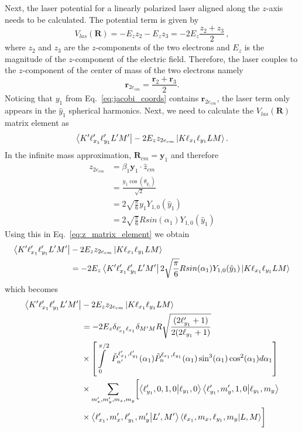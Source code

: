 Next, the laser potential for a linearly polarized laser aligned along the $z$-axis needs to be calculated. The potential term is given by
\begin{equation}
     V_{las}(\mathbf{R}) = - E_z z_2 - E_z z_3 = - 2E_z \frac{z_2 + z_3}{2}\, ,
\end{equation} 
where $z_2$ and $z_3$ are the $z$-components of the two electrons and $E_z$ is the magnitude of the $z$-component of the electric field.
Therefore, the laser couples to the $z$-component of the center of mass of the two electrons namely
\begin{equation}
    \mathbf{r}_{2e_{cm}} = \frac{\mathbf{r}_2 + \mathbf{r}_3}{2}.
\end{equation}
Noticing that $y_1$ from Eq.~\ref{eq:jacobi_coords} contains $\mathbf{r}_{2e_{cm}}$, the laser term only appears in the $\hat{y}_1$ spherical harmonics. 
Next, we need to calculate the $V_{las}(\mathbf{R})$ matrix element as
\begin{equation}
    \bra{K'\ell_{x_1}'\ell_{y_1}'L'M'} -2E_z z_{2e_{cm}} \ket{K \ell_{x_1} \ell_{y_1}LM}.
    \label{eq:z_matrix_element}
\end{equation} 
In the infinite mass approximation, $\mathbf{R}_{cm}=\mathbf{y}_1$  and therefore 
\begin{align}
z_{2e_{cm}}&=\beta_1 \mathbf{y}_1\cdot\hat{z}_{cm} \\
&= \frac{y_1\cos(\theta_{y_1})}{\sqrt{2}}\\
&= 2 \sqrt{\frac{\pi}{6}}y_1Y_{1,0}(\hat{y}_1)\\
&= 2 \sqrt{\frac{\pi}{6}}Rsin(\alpha_1)Y_{1,0}(\hat{y}_1)
\end{align}
Using this in Eq.~\ref{eq:z_matrix_element} we obtain 
\begin{align}
    \bra{K'\ell_{x_1}'\ell_{y_1}'L'M'}&  -2E_z z_{2e_{cm}} \ket{K \ell_{x_1} \ell_{y_1}LM} \\\nonumber
    &=-2E_z \bra{K'\ell_{x_1}'\ell_{y_1}'L'M'} 2\sqrt{\frac{\pi}{6}}Rsin(\alpha_1)Y_{1,0}(\hat{y}_1) \ket{K \ell_{x_1} \ell_{y_1}LM} 
\end{align}
which becomes
\begin{align}
    \nonumber\bra{K'\ell_{x_1}'\ell_{y_1}'L'M'}& -2E_z z_{2e_{cm}} \ket{K \ell_{x_1} \ell_{y_1}LM} \\\nonumber
    &= -2E_z\delta_{\ell_{x_1}'\ell_{x_1}} \delta_{M'M} R  \sqrt{\frac{(2\ell_{y_1}'+1)}{2(2\ell_{y_1}+1)}}\\\nonumber
    & \times \left[\int\limits_0^{\pi/2}\ \tilde{P}^{\ell_{x_1}',\ell_{y_1}'}_{n'}(\alpha_1) \tilde{P}^{\ell_{x_1},\ell_{y_1}}_{n}(\alpha_1) \sin^3(\alpha_1) \cos^2(\alpha_1)d\alpha_1\right]\\\nonumber
    & \times \sum\limits_{m_x',m_y',m_x,m_y} \biggl[\bra{\ell_{y_1}',0,1,0}\ket{\ell_{y_1},0} \bra{\ell_{y_1}',m_y',1,0}\ket{\ell_{y_1},m_y}\\
    & \times \bra{\ell_{x_1}',m_x',\ell_{y_1}',m_y'}\ket{L',M'} \bra{\ell_{x_1},m_x,\ell_{y_1},m_y}\ket{L,M}\biggr]
\end{align}
